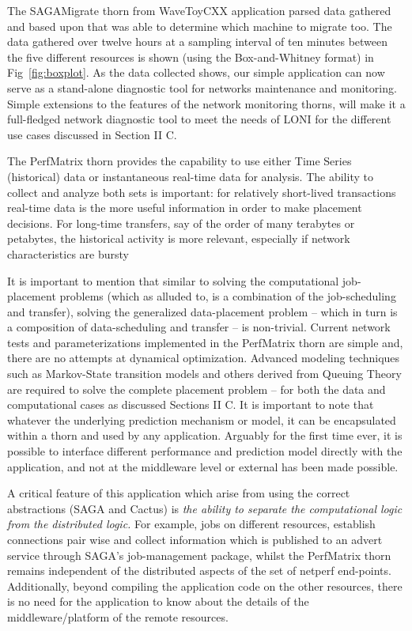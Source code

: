 \documentclass[conference,final]{IEEEtran}
\begin{document}
The SAGAMigrate thorn from WaveToyCXX application parsed data gathered
and based upon that was able to determine which machine to migrate
too. The data gathered over twelve hours at a sampling interval of ten
minutes between the five different resources is shown (using the
Box-and-Whitney format) in Fig~\ref{fig:boxplot}.  As the data
collected shows, our simple application can now serve as a stand-alone
diagnostic tool for networks maintenance and monitoring.  Simple
extensions to the features of the network monitoring thorns,
will make it a full-fledged network diagnostic tool to meet the needs
of LONI for the different use cases discussed in Section II C.

The PerfMatrix thorn provides the capability to use either Time Series
(historical) data or instantaneous real-time data for analysis.  The
ability to collect and analyze both sets is important: for relatively
short-lived transactions real-time data is the more useful information
in order to make placement decisions. For long-time transfers, say of
the order of many terabytes or petabytes, the historical activity is
more relevant, especially if network characteristics are bursty

It is important to mention that similar to solving the computational
job-placement problems (which as alluded to, is a combination of the
job-scheduling and transfer), solving the generalized data-placement
problem -- which in turn is a composition of data-scheduling and
transfer -- is non-trivial.  Current network tests and
parameterizations implemented in the PerfMatrix thorn are simple and,
there are no attempts at dynamical optimization. Advanced modeling
techniques such as Markov-State transition models and others derived
from Queuing Theory are required to solve the complete placement
problem -- for both the data and computational cases as discussed
Sections II C.  It is important to note that whatever the underlying
prediction mechanism or model, it can be encapsulated within a thorn
and used by any application. Arguably for the first time ever, it is
possible to interface different performance and prediction model
directly with the application, and not at the middleware level or
external has been made possible.

A critical feature of this application which arise from using the
correct abstractions (SAGA and Cactus) is {\it the ability to separate
  the computational logic from the distributed logic.}  For example,
jobs on different resources, establish connections pair wise and
collect information which is published to an advert service through
SAGA's job-management package, whilst the PerfMatrix thorn remains
independent of the distributed aspects of the set of netperf
end-points.  Additionally, beyond compiling the application code on
the other resources, there is no need for the application to know
about the details of the middleware/platform of the remote resources.
\end{document}
